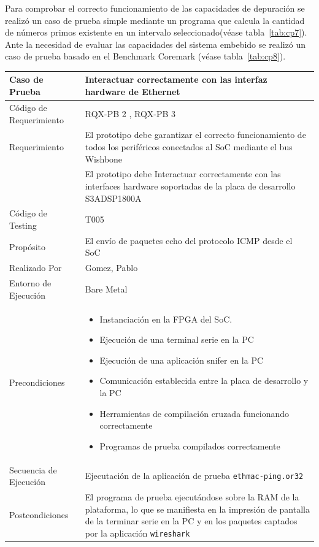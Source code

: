 		Para comprobar el correcto funcionamiento de las capacidades de depuración se realizó un caso de prueba simple mediante un programa que calcula la
		cantidad de números primos existente en un intervalo seleccionado(véase tabla~\ref{tab:cp7}). Ante la necesidad de evaluar las capacidades del sistema embebido se realizó un caso de prueba basado en el Benchmark Coremark (véase tabla~\ref{tab:cp8}).

\newpage
		\begin{table}[h!]
		\centering
		\begin{tabular}{ p{5cm} p{10cm}  }
		\hline 
		\rowcolor[gray]{0.8}  Caso de Prueba&  Interactuar correctamente con las interfaz hardware de Ethernet\\
		\hline 
		Código de Requerimiento & RQX-PB 2 , RQX-PB 3\\ 
		\hline 
		Requerimiento  &El prototipo debe garantizar el correcto funcionamiento de todos los periféricos conectados al SoC mediante el bus Wishbone\\ 
						&  El prototipo debe Interactuar correctamente con las interfaces hardware soportadas de la placa de desarrollo S3ADSP1800A\\
		\hline 
		Código de Testing & T005\\ 
		\hline
		Propósito &  El envío de paquetes echo del protocolo ICMP desde el SoC  \\
		\hline
		Realizado Por & Gomez, Pablo \\
		\hline	
		Entorno de Ejecución & Bare Metal \\
		\hline
		Precondiciones & \begin {itemize}
							\item Instanciación en la FPGA del SoC.
							\item Ejecución de una terminal serie en la PC
							\item Ejecución de una aplicación snifer en la PC
							\item Comunicación establecida entre la placa de desarrollo y la PC
							\item Herramientas de compilación cruzada funcionando correctamente
							\item Programas de prueba compilados correctamente
							\end {itemize} \\
		\hline
		Secuencia de Ejecución &  Ejecutación de la aplicación de prueba \verb|ethmac-ping.or32|\\
		\hline
		Postcondiciones &  El programa de prueba ejecutándose sobre la RAM de la plataforma, lo que se manifiesta en la impresión de pantalla de la terminar serie en la PC y en los paquetes captados por la aplicación \verb|wireshark| \\

\end{tabular}
\end{table}
